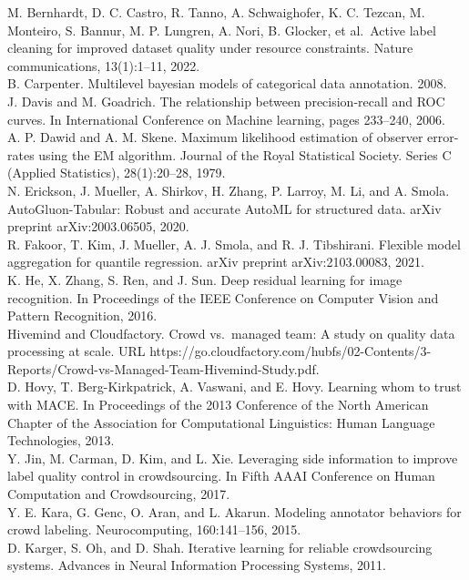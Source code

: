 \documentclass[
]{article}
\begin{document}
M. Bernhardt, D. C. Castro, R. Tanno, A. Schwaighofer, K. C. Tezcan, M.
Monteiro, S. Bannur, M. P. Lungren, A. Nori, B. Glocker, et al.~Active
label cleaning for improved dataset quality under resource constraints.
Nature communications, 13(1):1--11, 2022.\\
B. Carpenter. Multilevel bayesian models of categorical data annotation.
2008.\\
J. Davis and M. Goadrich. The relationship between precision-recall and
ROC curves. In International Conference on Machine learning, pages
233--240, 2006.\\
A. P. Dawid and A. M. Skene. Maximum likelihood estimation of observer
error-rates using the EM algorithm. Journal of the Royal Statistical
Society. Series C (Applied Statistics), 28(1):20--28, 1979.\\
N. Erickson, J. Mueller, A. Shirkov, H. Zhang, P. Larroy, M. Li, and A.
Smola. AutoGluon-Tabular: Robust and accurate AutoML for structured
data. arXiv preprint arXiv:2003.06505, 2020.\\
R. Fakoor, T. Kim, J. Mueller, A. J. Smola, and R. J. Tibshirani.
Flexible model aggregation for quantile regression. arXiv preprint
arXiv:2103.00083, 2021.\\
K. He, X. Zhang, S. Ren, and J. Sun. Deep residual learning for image
recognition. In Proceedings of the IEEE Conference on Computer Vision
and Pattern Recognition, 2016.\\
Hivemind and Cloudfactory. Crowd vs.~managed team: A study on quality
data processing at scale. URL
https://go.cloudfactory.com/hubfs/02-Contents/3-Reports/Crowd-vs-Managed-Team-Hivemind-Study.pdf.\\
D. Hovy, T. Berg-Kirkpatrick, A. Vaswani, and E. Hovy. Learning whom to
trust with MACE. In Proceedings of the 2013 Conference of the North
American Chapter of the Association for Computational Linguistics: Human
Language Technologies, 2013.\\
Y. Jin, M. Carman, D. Kim, and L. Xie. Leveraging side information to
improve label quality control in crowdsourcing. In Fifth AAAI Conference
on Human Computation and Crowdsourcing, 2017.\\
Y. E. Kara, G. Genc, O. Aran, and L. Akarun. Modeling annotator
behaviors for crowd labeling. Neurocomputing, 160:141--156, 2015.\\
D. Karger, S. Oh, and D. Shah. Iterative learning for reliable
crowdsourcing systems. Advances in Neural Information Processing
Systems, 2011.
\end{document}
